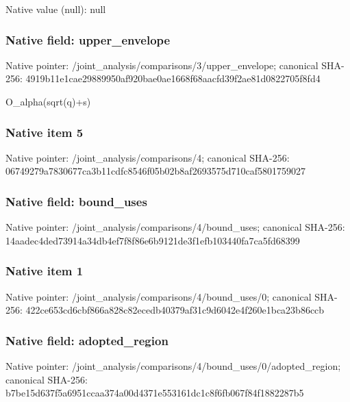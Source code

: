 \documentclass[10pt,a4paper]{article}
\begin{document}
Native value (null): null



\subsubsection{Native field: upper\_envelope}


Native pointer: /joint\_analysis/comparis\allowbreak{}ons/3/upper\_envelope; canonical SHA-256: 4919b11e1cae29889950af92\allowbreak{}0bae0ae1668f68aacfd39f2a\allowbreak{}e81d0822705f8fd4


O\_alpha(sqrt(q)+s)


\subsubsection{Native item 5}


Native pointer: /joint\_analysis/comparisons/4; canonical SHA-256: 06749279a7830677ca3b11cd\allowbreak{}fc8546f05b02b8af2693575d\allowbreak{}710caf5801759027



\subsubsection{Native field: bound\_uses}


Native pointer: /joint\_analysis/comparis\allowbreak{}ons/4/bound\_uses; canonical SHA-256: 14aadec4ded73914a34db4ef\allowbreak{}7f8f86e6b9121de3f1efb103\allowbreak{}440fa7ca5fd68399



\subsubsection{Native item 1}


Native pointer: /joint\_analysis/comparis\allowbreak{}ons/4/bound\_uses/0; canonical SHA-256: 422ce653cd6cbf866a828c82\allowbreak{}ecedb40379af31c9d6042e4f\allowbreak{}260e1bca23b86ccb



\subsubsection{Native field: adopted\_region}


Native pointer: /joint\_analysis/comparis\allowbreak{}ons/4/bound\_uses/0/adopt\allowbreak{}ed\_region; canonical SHA-256: b7be15d637f5a6951ccaa374\allowbreak{}a00d4371e553161dc1c8f6fb\allowbreak{}067f84f1882287b5
\end{document}
